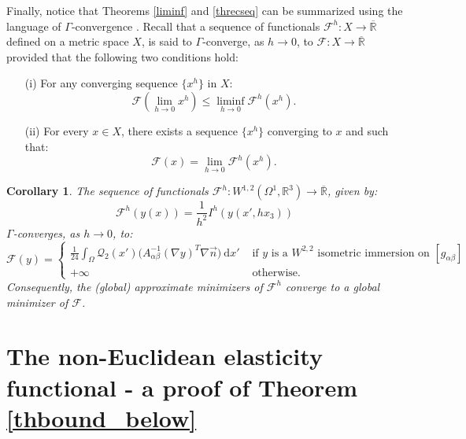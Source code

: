 \documentclass[leqno,twoside, 11pt]{amsart}
\theoremstyle{plain}
\newtheorem{corollary}[theorem]{Corollary}
\theoremstyle{definition}
\numberwithin{equation}{section}
\numberwithin{figure}{section}
\begin{document}
Finally, notice that Theorems \ref{liminf} and \ref{threcseq} can be summarized
using the language of $\Gamma$-convergence \cite{dalmaso}.
Recall  that a sequence of functionals
$\mathcal{F}^h:X\longrightarrow \overline{\mathbb{R}}$ defined on a metric
space $X$, is said to $\Gamma$-converge, as $h\to 0$, to
$\mathcal{F}:X\longrightarrow \overline{\mathbb{R}}$ provided that
the following two conditions hold:
\begin{itemize}
\item[(i)] For any converging sequence $\{x^h\}$ in $X$:
\begin{equation*}\label{Gamma1}
\mathcal{F}\left(\lim_{h\to 0} x^h\right) \leq \liminf_{h\to 0}
\mathcal{F}^h(x^h).
\end{equation*}
\item[(ii)] For every $x\in X$, there exists a sequence $\{x^h\}$ converging
to $x$ and such that:
\begin{equation*}\label{Gamma2}
\mathcal{F}(x) = \lim_{h\to 0} \mathcal{F}^h(x^h).
\end{equation*}
\end{itemize}

\begin{corollary}
The sequence of functionals $\mathcal{F}^h: W^{1,2}(\Omega^{1},\mathbb{R}^3)
\longrightarrow \overline{\mathbb{R}}$, given by:
$$\mathcal{F}^h(y(x)) = \frac{1}{h^2}I^h(y(x',hx_3))$$
$\Gamma$-converges, as $h\to 0$, to:
\begin{equation*}
\mathcal{F}(y) = \left\{\begin{array}{ll}
{\displaystyle \frac{1}{24}\int_\Omega
\mathcal{Q}_2(x') \Big(A_{\alpha\beta}^{-1} (\nabla y)^T
\nabla\vec n\Big)~\mathrm{d}x'}
& \mbox{ if $y$ is a $W^{2,2}$ isometric immersion on $[g_{\alpha\beta}]$}
\\
+\infty & \mbox{ otherwise.}
\end{array}\right.
\end{equation*}
Consequently, the (global) approximate minimizers of $\mathcal{F}^h$
converge to a global minimizer of $\mathcal{F}$.
\end{corollary}

\section{The non-Euclidean elasticity functional - a proof of Theorem 
\ref{thbound_below}}
\end{document}
